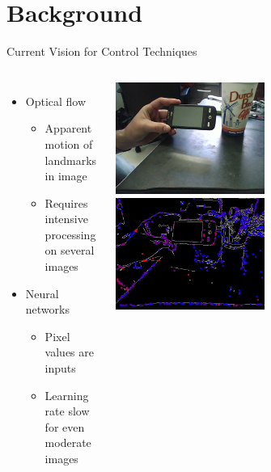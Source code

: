 \documentclass{beamer}
\begin{document}
\section{Background}

	\begin{frame}{Current Vision for Control Techniques}
	\begin{columns}[l c]


			\begin{itemize}
			\item Optical flow
				\begin{itemize}
				\item Apparent motion of landmarks in image
				\item Requires intensive processing on several images
				\end{itemize}

			\item Neural networks
				\begin{itemize}
				\item Pixel values are inputs
				\item Learning rate slow for even moderate images
				\end{itemize}

			\end{itemize}


			\vspace{-24pt}
			\includegraphics[width=0.5\textwidth]{input.jpg}
			\includegraphics[width=0.5\textwidth]{output.jpg}
			\\


\end{columns}
\end{frame}
\end{document}
